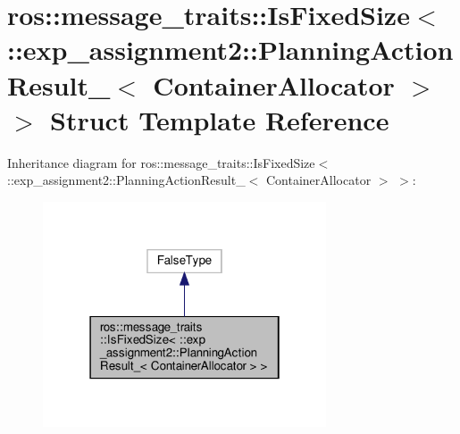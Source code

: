 \hypertarget{structros_1_1message__traits_1_1IsFixedSize_3_01_1_1exp__assignment2_1_1PlanningActionResult___3_01ContainerAllocator_01_4_01_4}{}\section{ros\+:\+:message\+\_\+traits\+:\+:Is\+Fixed\+Size$<$ \+:\+:exp\+\_\+assignment2\+:\+:Planning\+Action\+Result\+\_\+$<$ Container\+Allocator $>$ $>$ Struct Template Reference}
\label{structros_1_1message__traits_1_1IsFixedSize_3_01_1_1exp__assignment2_1_1PlanningActionResult___3_01ContainerAllocator_01_4_01_4}


Inheritance diagram for ros\+:\+:message\+\_\+traits\+:\+:Is\+Fixed\+Size$<$ \+:\+:exp\+\_\+assignment2\+:\+:Planning\+Action\+Result\+\_\+$<$ Container\+Allocator $>$ $>$\+:
\nopagebreak
\begin{figure}[H]
\begin{center}
\leavevmode
\includegraphics[width=238pt]{structros_1_1message__traits_1_1IsFixedSize_3_01_1_1exp__assignment2_1_1PlanningActionResult___379487dd38d1082ffc5c3b01bec35ebd3}
\end{center}
\end{figure}


